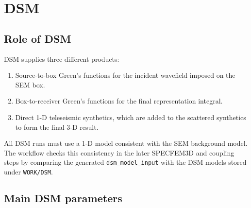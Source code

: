 \documentclass[11pt,oneside]{book}
\DeclareRobustCommand{\code}[1]{\nolinkurl{#1}}
\begin{document}
\chapter{DSM}

\section{Role of DSM}

DSM supplies three different products:
\begin{enumerate}[label=\arabic*.]
  \item Source-to-box Green's functions for the incident wavefield imposed on
  the SEM box.
  \item Box-to-receiver Green's functions for the final representation
  integral.
  \item Direct 1-D teleseismic synthetics, which are added to the scattered
  synthetics to form the final 3-D result.
\end{enumerate}

All DSM runs must use a 1-D model consistent with the SEM background model.
The workflow checks this consistency in the later SPECFEM3D and coupling
steps by comparing the generated \code{dsm_model_input} with the DSM models
stored under \code{WORK/DSM}.

\section{Main DSM parameters}
\end{document}
